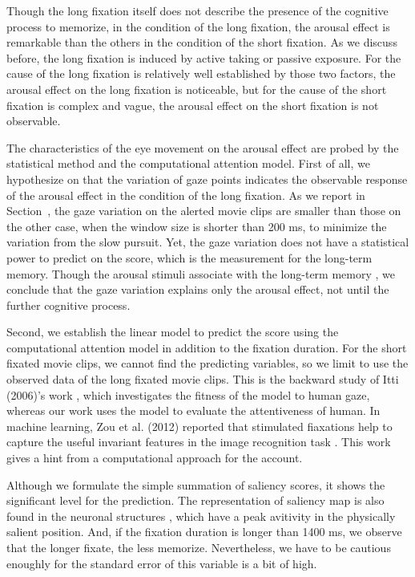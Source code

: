 \documentclass[oneside,master]{snueethesis}
\begin{document}
Though the long fixation itself does not describe the presence of the cognitive process to memorize, in the condition of the long fixation, the arousal effect is remarkable than the others in the condition of the short fixation. As we discuss before, the long fixation is induced by active taking or passive exposure. For the cause of the long fixation is relatively well established by those two factors, the arousal effect on the long fixation is noticeable, but for the cause of the short fixation is complex and vague, the arousal effect on the short fixation is not observable.

The characteristics of the eye movement on the arousal effect are probed by the statistical method and the computational attention model. First of all, we hypothesize on that the variation of gaze points indicates the observable response of the arousal effect in the condition of the long fixation. As we report in Section~, the gaze variation on the alerted movie clips are smaller than those on the other case, when the window size is shorter than 200 ms, to minimize the variation from the slow pursuit. Yet, the gaze variation does not have a statistical power to predict on the score, which is the measurement for the long-term memory. Though the arousal stimuli associate with the long-term memory \cite{Cahill1996amyg,Cahill1998baso}, we conclude that the gaze variation explains only the arousal effect, not until the further cognitive process. 

Second, we establish the linear model to predict the score using the computational attention model \cite{itti1998model} in addition to the fixation duration. For the short fixated movie clips, we cannot find the predicting variables, so we limit to use the observed data of the long fixated movie clips. This is the backward study of Itti (2006)’s work \cite{Itti2006}, which investigates the fitness of the model to human gaze, whereas our work uses the model to evaluate the attentiveness of human. In machine learning, Zou et al. (2012) reported that stimulated fiaxations help to capture the useful invariant features in the image recognition task \cite{Zou2012}. This work gives a hint from a computational approach for the account.

Although we formulate the simple summation of saliency scores, it shows the significant level for the prediction. The representation of saliency map is also found in the neuronal structures \cite{Fecteau2006}, which have a peak avitivity in the physically salient position. And, if the fixation duration is longer than 1400 ms, we observe that the longer fixate, the less memorize. Nevertheless, we have to be cautious enoughly for the standard error of this variable is a bit of high. 
\end{document}
